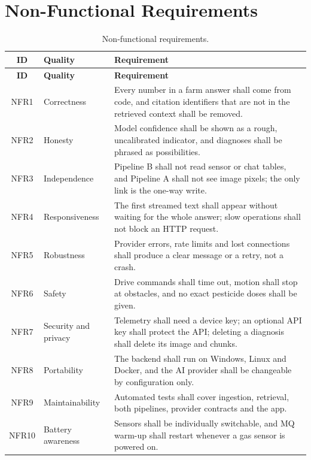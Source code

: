 \section{Non-Functional Requirements}

{\small
\begin{longtable}{|c|P{2.6cm}|P{9.4cm}|}
\caption{Non-functional requirements.}\label{tab:nfr}\\
\hline
\textbf{ID} & \textbf{Quality} & \textbf{Requirement}\\\hline
\endfirsthead
\hline
\textbf{ID} & \textbf{Quality} & \textbf{Requirement}\\\hline
\endhead
NFR1 & Correctness & Every number in a farm answer shall come from code, and citation identifiers that are not in the retrieved context shall be removed.\\\hline
NFR2 & Honesty & Model confidence shall be shown as a rough, uncalibrated indicator, and diagnoses shall be phrased as possibilities.\\\hline
NFR3 & Independence & Pipeline B shall not read sensor or chat tables, and Pipeline A shall not see image pixels; the only link is the one-way write.\\\hline
NFR4 & Responsiveness & The first streamed text shall appear without waiting for the whole answer; slow operations shall not block an HTTP request.\\\hline
NFR5 & Robustness & Provider errors, rate limits and lost connections shall produce a clear message or a retry, not a crash.\\\hline
NFR6 & Safety & Drive commands shall time out, motion shall stop at obstacles, and no exact pesticide doses shall be given.\\\hline
NFR7 & Security and privacy & Telemetry shall need a device key; an optional API key shall protect the API; deleting a diagnosis shall delete its image and chunks.\\\hline
NFR8 & Portability & The backend shall run on Windows, Linux and Docker, and the AI provider shall be changeable by configuration only.\\\hline
NFR9 & Maintainability & Automated tests shall cover ingestion, retrieval, both pipelines, provider contracts and the app.\\\hline
NFR10 & Battery awareness & Sensors shall be individually switchable, and MQ warm-up shall restart whenever a gas sensor is powered on.\\\hline
\end{longtable}
}

